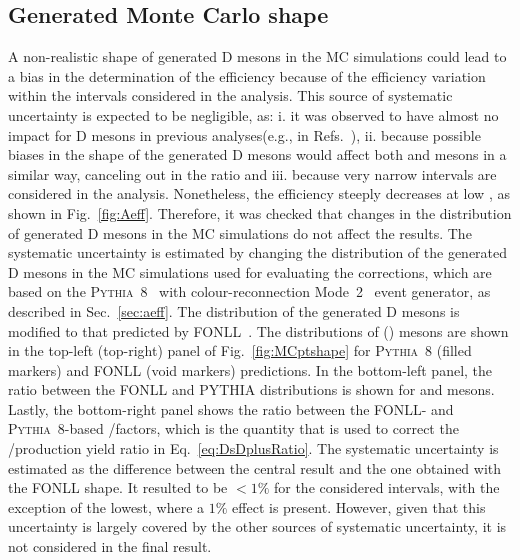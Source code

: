 \subsection{\texorpdfstring{Generated Monte Carlo \pt shape}{Generated Monte Carlo pT shape}}
A non-realistic \pt shape of generated D mesons in the MC simulations could lead to a bias in the determination of the efficiency because of the efficiency variation within the \pt intervals considered in the analysis. This source of systematic uncertainty is expected to be negligible, as: i. it was observed to have almost no impact for D mesons in previous analyses(e.g., in Refs.~\cite{ALICE:2021mgk,ALICE:2023sgl}), ii. because possible biases in the \pt shape of the generated D mesons would affect both \ds and \dpl mesons in a similar way, canceling out in the ratio and iii. because very narrow \pt intervals are considered in the analysis. Nonetheless, the efficiency steeply decreases at low \pt, as shown in Fig.~\ref{fig:Aeff}. Therefore, it was checked that changes in the \pt distribution of generated D mesons in the MC simulations do not affect the results. The systematic uncertainty is estimated by changing the \pt distribution of the generated D mesons in the MC simulations used for evaluating the \aeff corrections, which are based on the \textsc{Pythia~8}~\cite{Bierlich:2022pfr} with colour-reconnection Mode~2~\cite{Christiansen:2015yqa} event generator, as described in Sec.~\ref{sec:aeff}. The \pt distribution of the generated D mesons is modified to that predicted by FONLL~\cite{Cacciari:1998it}. The \pt distributions of \ds (\dpl) mesons are shown in the top-left (top-right) panel of Fig.~\ref{fig:MCptshape} for \textsc{Pythia}~8 (filled markers) and FONLL (void markers) predictions. In the bottom-left panel, the ratio between the FONLL and PYTHIA \pt distributions is shown for \ds and \dpl mesons. Lastly, the bottom-right panel shows the ratio between the FONLL- and \textsc{Pythia}~8-based \aeffpds/\aeffpdpl factors, which is the quantity that is used to correct the \ds/\dpl production yield ratio in Eq.~\ref{eq:DsDplusRatio}. The systematic uncertainty is estimated as the difference between the central result and the one obtained with the FONLL \pt shape. It resulted to be $<1\%$ for the considered \pt intervals, with the exception of the lowest, where a $1\%$ effect is present. However, given that this uncertainty is largely covered by the other sources of systematic uncertainty, it is not considered in the final result.

